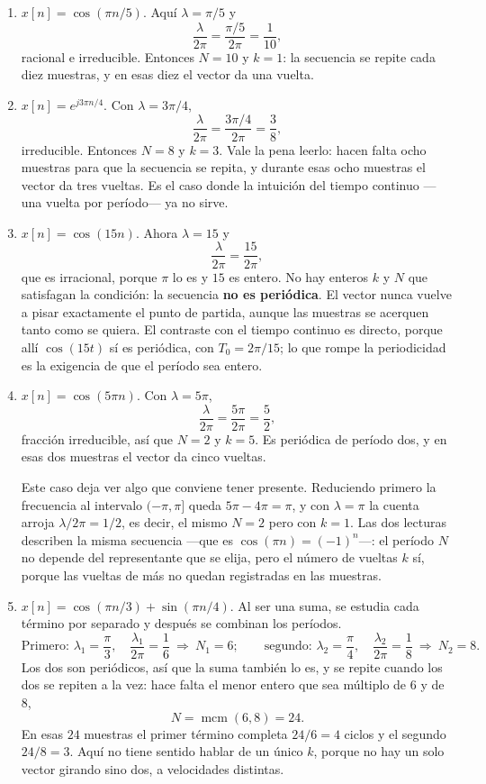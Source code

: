 \documentclass[10pt,a4paper]{article}
\begin{document}
	\begin{enumerate}
		\item $x[n]=\cos(\pi n/5)$. Aquí $\lambda = \pi/5$ y
		\[
			\frac{\lambda}{2\pi} = \frac{\pi/5}{2\pi} = \frac{1}{10},
		\]
		racional e irreducible. Entonces $N=10$ y $k=1$: la secuencia se repite cada diez
		muestras, y en esas diez el vector da una vuelta.

		\item $x[n]=e^{j3\pi n/4}$. Con $\lambda=3\pi/4$,
		\[
			\frac{\lambda}{2\pi} = \frac{3\pi/4}{2\pi} = \frac{3}{8},
		\]
		irreducible. Entonces $N=8$ y $k=3$. Vale la pena leerlo: hacen falta ocho muestras
		para que la secuencia se repita, y durante esas ocho muestras el vector da tres
		vueltas. Es el caso donde la intuición del tiempo continuo ---una vuelta por
		período--- ya no sirve.

		\item $x[n]=\cos(15n)$. Ahora $\lambda = 15$ y
		\[
			\frac{\lambda}{2\pi} = \frac{15}{2\pi},
		\]
		que es irracional, porque $\pi$ lo es y $15$ es entero. No hay enteros $k$ y $N$ que
		satisfagan la condición: la secuencia \textbf{no es periódica}. El vector nunca vuelve
		a pisar exactamente el punto de partida, aunque las muestras se acerquen tanto como se
		quiera. El contraste con el tiempo continuo es directo, porque allí $\cos(15t)$ sí es
		periódica, con $T_0=2\pi/15$; lo que rompe la periodicidad es la exigencia de que el período sea
		entero.

		\item $x[n]=\cos(5\pi n)$. Con $\lambda=5\pi$,
		\[
			\frac{\lambda}{2\pi} = \frac{5\pi}{2\pi} = \frac{5}{2},
		\]
		fracción irreducible, así que $N=2$ y $k=5$. Es periódica de período dos, y en esas
		dos muestras el vector da cinco vueltas.

		Este caso deja ver algo que conviene tener presente. Reduciendo primero la frecuencia
		al intervalo $(-\pi,\pi]$ queda $5\pi - 4\pi = \pi$, y con $\lambda=\pi$ la cuenta
		arroja $\lambda/2\pi = 1/2$, es decir, el mismo $N=2$ pero con $k=1$. Las dos lecturas
		describen la misma secuencia ---que es $\cos(\pi n) = (-1)^n$---: el período $N$ no
		depende del representante que se elija, pero el número de vueltas $k$ sí, porque las
		vueltas de más no quedan registradas en las muestras.

		\item $x[n]=\cos(\pi n/3)+\sin(\pi n/4)$. Al ser una suma, se estudia cada
		término por separado y después se combinan los períodos.
		\[
			\text{Primero: } \lambda_1=\frac{\pi}{3},\quad \frac{\lambda_1}{2\pi}=\frac{1}{6}
			\ \Rightarrow\ N_1=6;
			\qquad
			\text{segundo: } \lambda_2=\frac{\pi}{4},\quad \frac{\lambda_2}{2\pi}=\frac{1}{8}
			\ \Rightarrow\ N_2=8.
		\]
		Los dos son periódicos, así que la suma también lo es, y se repite cuando los dos se
		repiten a la vez: hace falta el menor entero que sea múltiplo de $6$ y de $8$,
		\[
			N = \operatorname{mcm}(6,8) = 24.
		\]
		En esas $24$ muestras el primer término completa $24/6=4$ ciclos y el segundo
		$24/8=3$. Aquí no tiene sentido hablar de un único $k$, porque no hay un solo vector
		girando sino dos, a velocidades distintas.
	\end{enumerate}
\end{document}
